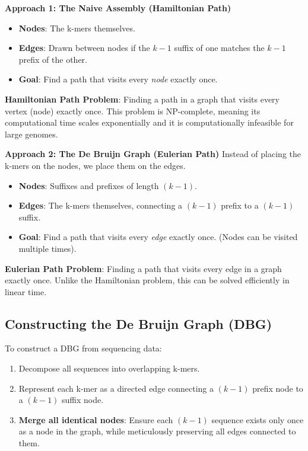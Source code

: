 \documentclass[11pt,a4paper]{article}
\newenvironment{important}{
    \vspace{1em}
    \begin{tcolorbox}[colback=blue!5!white, colframe=blue!75!black, boxrule=1pt, arc=4pt, left=10pt, right=10pt, top=10pt, bottom=10pt]
}{
    \end{tcolorbox}
    \vspace{1em}
}
\begin{document}
\textbf{Approach 1: The Naive Assembly (Hamiltonian Path)}
\begin{itemize}
    \item \textbf{Nodes}: The k-mers themselves.
    \item \textbf{Edges}: Drawn between nodes if the $k-1$ suffix of one matches the $k-1$ prefix of the other.
    \item \textbf{Goal}: Find a path that visits every \textit{node} exactly once.
\end{itemize}
\begin{important}
\textbf{Hamiltonian Path Problem}: Finding a path in a graph that visits every vertex (node) exactly once. This problem is NP-complete, meaning its computational time scales exponentially and it is computationally infeasible for large genomes.
\end{important}

\textbf{Approach 2: The De Bruijn Graph (Eulerian Path)}
Instead of placing the k-mers on the nodes, we place them on the edges.
\begin{itemize}
    \item \textbf{Nodes}: Suffixes and prefixes of length $(k-1)$.
    \item \textbf{Edges}: The k-mers themselves, connecting a $(k-1)$ prefix to a $(k-1)$ suffix.
    \item \textbf{Goal}: Find a path that visits every \textit{edge} exactly once. (Nodes can be visited multiple times).
\end{itemize}
\begin{important}
\textbf{Eulerian Path Problem}: Finding a path that visits every edge in a graph exactly once. Unlike the Hamiltonian problem, this can be solved efficiently in linear time.
\end{important}

\subsection{Constructing the De Bruijn Graph (DBG)}

To construct a DBG from sequencing data:
\begin{enumerate}
    \item Decompose all sequences into overlapping k-mers.
    \item Represent each k-mer as a directed edge connecting a $(k-1)$ prefix node to a $(k-1)$ suffix node.
    \item \textbf{Merge all identical nodes}: Ensure each $(k-1)$ sequence exists only once as a node in the graph, while meticulously preserving all edges connected to them. 
\end{enumerate}
\end{document}
